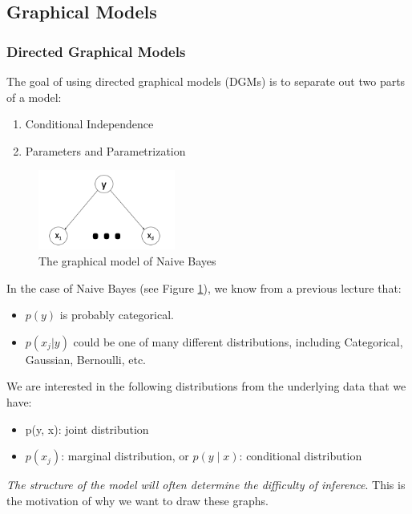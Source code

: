 \documentclass{article}
\begin{document}
\subsection{Graphical Models}
\subsubsection{Directed Graphical Models}

The goal of using directed graphical models (DGMs) is to separate out two parts of a model:
\begin{enumerate}
\item Conditional Independence
\item Parameters and Parametrization
\end{enumerate}

\begin{figure}[!ht]
    \centering
    \includegraphics[width = 0.4\textwidth]{nb1.png}
    \caption{The graphical model of Naive Bayes}
    \label{fig:nb1}
\end{figure}


\noindent
In the case of Naive Bayes (see Figure \ref{fig:nb1}), we know from a previous lecture that:
\begin{itemize}
\item $p(y)$ is probably categorical.
\item $p(x_{j}|y)$ could be one of many different distributions, including Categorical, Gaussian, Bernoulli, etc.
\end{itemize}
We are interested in the following distributions from the underlying data that we have:
\begin{itemize}
\item p(y, x): joint distribution
\item $p(x_{j})$: marginal distribution, or $p(y \mid x)$: conditional distribution
\end{itemize}



\emph{The structure of the model will often determine the difficulty of inference}. This is the motivation of why we want to draw these graphs.
\end{document}
